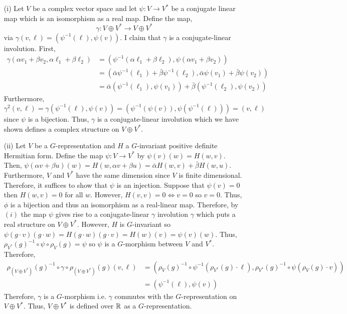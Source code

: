 \documentclass[12pt]{extarticle}
\begin{document}
\begin{enumerate}
\item[(i)] Let $V$ be a complex vector space and let $\psi : V \to V^*$ be a conjugate linear map which is an isomorphism as a real map. Define the map,
\[ \gamma : V \oplus V^* \to V \oplus V^* \]
via $\gamma(v, \ell) = (\psi^{-1}(\ell), \psi(v))$. I claim that $\gamma$ is a conjugate-linear involution. First,
\begin{align*}
\gamma(\alpha v_1 + \beta v_2, \alpha \ell_1 + \beta \ell_2) & = (\psi^{-1}(\alpha \ell_1 + \beta \ell_2), \psi(\alpha v_1 + \beta v_2)) 
\\
& = (\bar{\alpha} \psi^{-1}(\ell_1) + \bar{\beta} \psi^{-1}(\ell_2), \bar{\alpha} \psi(v_1) + \bar{\beta} \psi(v_2) ) 
\\
& = \bar{\alpha} (\psi^{-1}(\ell_1), \psi(v_1)) + \bar{\beta} (\psi^{-1}(\ell_2), \psi(v_2)) 
\end{align*}
Furthermore,
\[ \gamma^2(v, \ell) = \gamma(\psi^{-1}(\ell), \psi(v)) = (\psi^{-1}(\psi(v)), \psi(\psi^{-1}(\ell))) = (v, \ell) 
\]
since $\psi$ is a bijection. Thus, $\gamma$ is a conjugate-linear involution which we have shown defines a complex structure on $V \oplus V^*$.
 
\item[(ii)]
Let $V$ be a $G$-representation and $H$ a $G$-invariant positive definite Hermitian form. Define the map $\psi : V \to V^*$ by $\psi(v)(w) = H(w, v)$. Then, $\psi(\alpha v + \beta u)(w) = H(w, \alpha v + \beta u) = \bar{\alpha} H(w, v) + \bar{\beta} H(w, u)$. Furthermore, $V$ and $V^*$ have the same dimension since $V$ is finite dimensional. Therefore, it suffices to show that $\psi$ is an injection. Suppose that $\psi(v) = 0$ then $H(w, v) = 0$ for all $w$. However, $H(v, v) = 0 \iff v = 0$ so $v = 0$. Thus, $\phi$ is a bijection and thus an isomorphism as a real-linear map. Therefore, by $(i)$ the map $\psi$ gives rise to a conjugate-linear $\gamma$ involution $\gamma$ which puts a real structure on $V \oplus V^*$. However, $H$ is $G$-invariant so $\psi(g \cdot v)(g \cdot w) = H(g \cdot w)(g \cdot v) = H(w)(v) = \psi(v)(w)$. Thus, $\rho_{V^*}(g)^{-1} \circ \psi \circ \rho_{V}(g) = \psi$ so $\psi$ is a $G$-morphism between $V$ and $V^*$. Therefore,
\begin{align*}
\rho_{(V \oplus V^*)}(g)^{-1} \circ \gamma \circ \rho_{(V \oplus V^*)}(g) (v, \ell) & = (\rho_V(g)^{-1} \circ \psi^{-1}(\rho_{V^*}(g) \cdot \ell), \rho_{V^*}(g)^{-1} \circ \psi(\rho_V(g) \cdot v))
\\
& = (\psi^{-1}(\ell), \psi(v)) 
\end{align*}
Therefore, $\gamma$ is a $G$-morphism i.e. $\gamma$ commutes with the $G$-representation on $V \oplus V^*$. Thus, $V \oplus V^*$ is defined over $\mathbb{R}$ as a $G$-representation.  

\end{enumerate}
\end{document}
